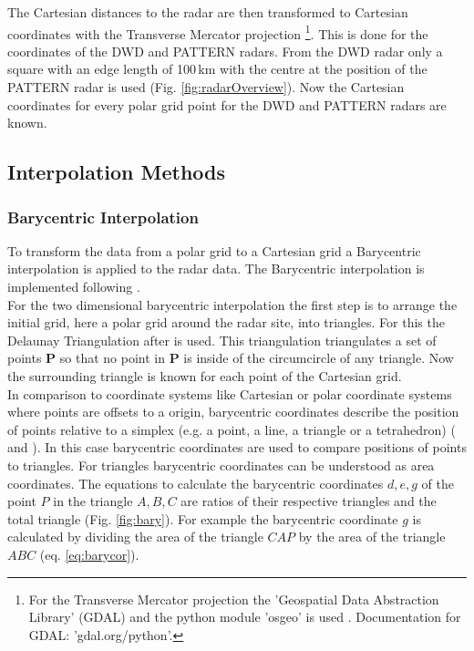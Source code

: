 \documentclass[11pt,twoside,a4paper,fleqn,x11names]{report}
\numberwithin{equation}{chapter}
\numberwithin{figure}{chapter}
\numberwithin{table}{chapter}
\begin{document}
The Cartesian distances to the radar are then transformed to Cartesian coordinates with the Transverse Mercator projection \footnote{For the Transverse Mercator projection the 'Geospatial Data Abstraction Library' (GDAL) and the python module 'osgeo' is used \citep{Warmerdam}. Documentation for GDAL: 'gdal.org/python'.}. This is done for the coordinates of the DWD and PATTERN radars. From the DWD radar only a square with an edge length of 100\,km with the centre at the position of the PATTERN radar is used (Fig. \ref{fig:radarOverview}). Now the Cartesian coordinates for every polar grid point for the DWD and PATTERN radars are known. 
\subsection{Interpolation Methods}
\subsubsection{Barycentric Interpolation}
To transform the data from a polar grid to a Cartesian grid a Barycentric interpolation is applied to the radar data. The Barycentric interpolation is implemented following \cite{bary}. \\
For the two dimensional barycentric interpolation the first step is to arrange the initial grid, here a polar grid around the radar site, into triangles. For this the Delaunay Triangulation after \cite{delaunay} is used. This triangulation triangulates a set of points \textbf{P} so that no point in \textbf{P} is inside of the circumcircle of any triangle. Now the surrounding triangle is known for each point of the Cartesian grid.\\
In comparison to coordinate systems like Cartesian or polar coordinate systems where points are offsets to a origin, barycentric coordinates describe the position of points relative to a simplex (e.g. a point, a line, a triangle or a tetrahedron) (\citealp{bary} and \citealp{baryBerrut}). In this case barycentric coordinates are used to compare positions of points to triangles. For triangles barycentric coordinates can be understood as area coordinates. The equations to calculate the barycentric coordinates $d,e,g$ of the point $P$ in the triangle $A,B,C$ are ratios of their respective triangles and the total triangle (Fig. \ref{fig:bary}). For example the barycentric coordinate $g$ is calculated by dividing the area of the triangle $CAP$ by the area of the triangle $ABC$ (eq. \ref{eq:barycor}).
\end{document}
